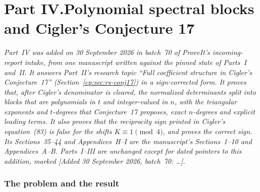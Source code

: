 \documentclass[11pt]{article}
\theoremstyle{definition}
\theoremstyle{remark}
\theoremstyle{definition}
\theoremstyle{plain}
\numberwithin{equation}{section}
\begin{document}
\clearpage
\renewcommand{\thesection}{\arabic{section}}
\renewcommand{\theHsection}{sb.\arabic{section}}
\setcounter{section}{34}
\part*{Part IV.\quad Polynomial spectral blocks and Cigler's Conjecture 17}

\noindent\emph{Part~IV was added on 30 September 2026 in batch~70 of
ProveIt's incoming-report intake, from one manuscript written against the
pinned state of Parts~I and~II. It answers Part~II's research topic ``Full
coefficient structure in Cigler's Conjecture~17''
(Section~\ref{cp:sec:rs-conj17}) in a sign-corrected form. It proves that,
after Cigler's denominator is cleared, the normalized determinants split
into blocks that are polynomials in $t$ and integer-valued in $n$, with the
triangular exponents and $t$-degrees that Conjecture~17 proposes, exact
$n$-degrees and explicit leading terms. It also proves that the reciprocity
sign printed in Cigler's equation~(83) is false for the shifts
$K\equiv1\pmod4$, and proves the correct sign. Its Sections~35--44 and
Appendices~H--I are the manuscript's Sections~1--10 and Appendices~A--B.
Parts~I--III are unchanged except for dated pointers to this addition,
marked \textup{[Added 30 September 2026, batch~70: \dots]}.}

\section{The problem and the result}
\label{sb:sec:introduction}
\end{document}
